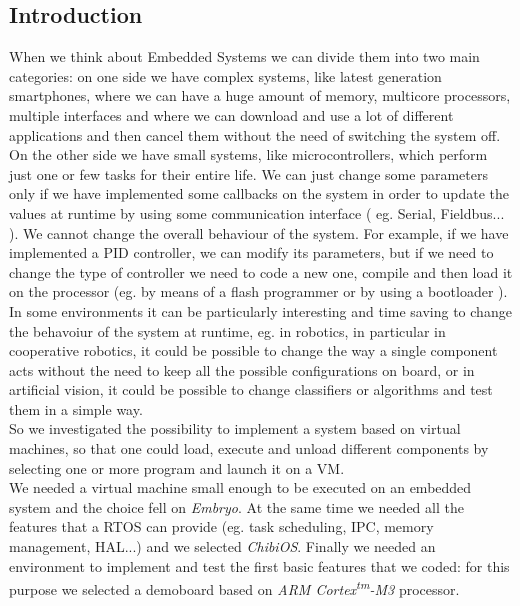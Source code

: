 \documentclass[a4paper,10pt]{article}
\begin{document}
\vspace{4ex}	%
\begin{multicols}{2}

\section{Introduction}

When we think about Embedded Systems we can divide them into two main categories: on one side we have complex systems, like latest generation smartphones, where we can have a huge amount of memory, multicore processors, multiple interfaces and where we can download and use a lot of different applications and then cancel them without the need of switching the system off. On the other side we have small systems, like microcontrollers, which perform just one or few tasks for their entire life. We can just change some parameters only if we have implemented some callbacks on the system in order to update the values at runtime by using some communication interface ( eg. Serial, Fieldbus... ). We cannot change the overall behaviour of the system. For example, if we have implemented a PID controller, we can modify its parameters, but if we need to change the type of controller we need to code a new one, compile and then load it on the processor (eg. by means of a flash programmer or by using a bootloader ).\\

In some environments it can be particularly interesting and time saving to change the behavoiur of the system at runtime, eg. in robotics, in particular in cooperative robotics, it could be possible to change the way a single component acts without the need to keep all the possible configurations on board, or in artificial vision, it could be possible to change classifiers or algorithms and test them in a simple way.\\

So we investigated the possibility to implement a system based on virtual machines, so that one could load, execute and unload different components by selecting one or more program and launch it on a VM.\\

We needed a virtual machine small enough to be executed on an embedded system and the choice fell on \textit{Embryo}. At the same time we needed all the features that a RTOS can provide (eg. task scheduling, IPC, memory management, HAL...) and we selected \textit{ChibiOS}. Finally we needed an environment to implement and test the first basic features that we coded: for this purpose we selected a demoboard based on \textit{ARM Cortex\textsuperscript{tm}-M3} processor.


\end{multicols}
\end{document}
